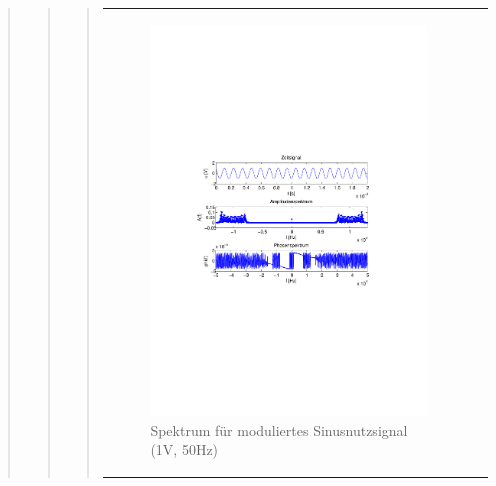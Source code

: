 \begin{quote}
\begin{quote}
\begin{quote}
\begin{center}
\begin{tabular}{ll}
\begin{minipage}{0.6\textwidth}
                \end{minipage}
                \begin{minipage}{0.6\textwidth}

                     \begin{figure}[H]
                        \label{fig:}
                        \includegraphics[scale=0.5, trim = 4cm 9.5cm 3.5cm
                        9.5cm, clip]{./Bilder/sin_a1_f50}
                        \caption{Spektrum für moduliertes Sinusnutzsignal (1V,
                        50Hz)}
                    \end{figure}
               \vspace{-1.5em}

                \end{minipage}


\end{tabular}
\end{center}
\end{quote}
\end{quote}
\end{quote}
